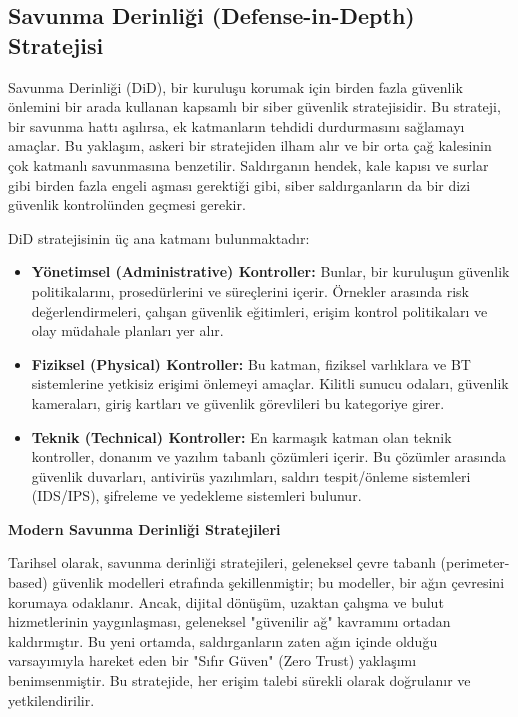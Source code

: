 \subsection{Savunma Derinliği (Defense-in-Depth) Stratejisi}

Savunma Derinliği (DiD), bir kuruluşu korumak için birden fazla güvenlik önlemini bir arada kullanan kapsamlı bir siber güvenlik stratejisidir. Bu strateji, bir savunma hattı aşılırsa, ek katmanların tehdidi durdurmasını sağlamayı amaçlar. Bu yaklaşım, askeri bir stratejiden ilham alır ve bir orta çağ kalesinin çok katmanlı savunmasına benzetilir. Saldırganın hendek, kale kapısı ve surlar gibi birden fazla engeli aşması gerektiği gibi, siber saldırganların da bir dizi güvenlik kontrolünden geçmesi gerekir.

DiD stratejisinin üç ana katmanı bulunmaktadır:

\begin{itemize}
    \item \textbf{Yönetimsel (Administrative) Kontroller:} Bunlar, bir kuruluşun güvenlik politikalarını, prosedürlerini ve süreçlerini içerir. Örnekler arasında risk değerlendirmeleri, çalışan güvenlik eğitimleri, erişim kontrol politikaları ve olay müdahale planları yer alır.
    \item \textbf{Fiziksel (Physical) Kontroller:} Bu katman, fiziksel varlıklara ve BT sistemlerine yetkisiz erişimi önlemeyi amaçlar. Kilitli sunucu odaları, güvenlik kameraları, giriş kartları ve güvenlik görevlileri bu kategoriye girer.
    \item \textbf{Teknik (Technical) Kontroller:} En karmaşık katman olan teknik kontroller, donanım ve yazılım tabanlı çözümleri içerir. Bu çözümler arasında güvenlik duvarları, antivirüs yazılımları, saldırı tespit/önleme sistemleri (IDS/IPS), şifreleme ve yedekleme sistemleri bulunur.
\end{itemize}

\textbf{Modern Savunma Derinliği Stratejileri}

Tarihsel olarak, savunma derinliği stratejileri, geleneksel çevre tabanlı (perimeter-based) güvenlik modelleri etrafında şekillenmiştir; bu modeller, bir ağın çevresini korumaya odaklanır. Ancak, dijital dönüşüm, uzaktan çalışma ve bulut hizmetlerinin yaygınlaşması, geleneksel "güvenilir ağ" kavramını ortadan kaldırmıştır. Bu yeni ortamda, saldırganların zaten ağın içinde olduğu varsayımıyla hareket eden bir "Sıfır Güven" (Zero Trust) yaklaşımı benimsenmiştir. Bu stratejide, her erişim talebi sürekli olarak doğrulanır ve yetkilendirilir.

